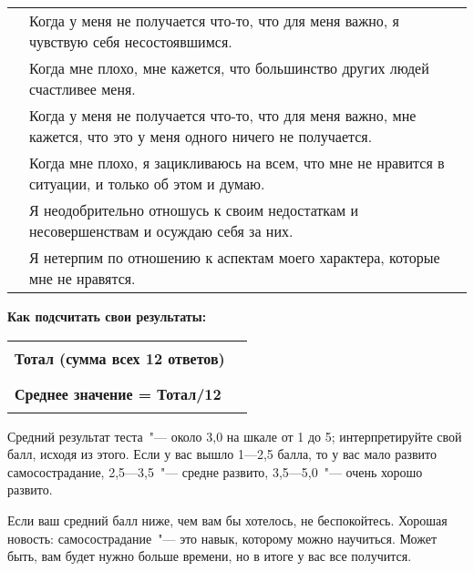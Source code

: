 \begin{center}
	\setlength{\extrarowheight}{2mm}
	\begin{tabularx}{\textwidth}{p{1.7cm}X}
		\noindent\rule{1.7cm}{0.4pt} & Когда у меня не получается что-то, что для меня важно, я чувствую себя несостоявшимся. \\
		\noindent\rule{1.7cm}{0.4pt} & Когда мне плохо, мне кажется, что большинство других людей счастливее меня. \\
		\noindent\rule{1.7cm}{0.4pt} & Когда у меня не получается что-то, что для меня важно, мне кажется, что это у меня одного ничего не получается. \\
		\noindent\rule{1.7cm}{0.4pt} & Когда мне плохо, я зацикливаюсь на всем, что мне не нравится в ситуации, и только об этом и думаю. \\
		\noindent\rule{1.7cm}{0.4pt} & Я неодобрительно отношусь к своим недостаткам и несовершенствам и осуждаю себя за них. \\
		\noindent\rule{1.7cm}{0.4pt} & Я нетерпим по отношению к аспектам моего характера, которые мне не нравятся. \\
	\end{tabularx}
	\setlength{\extrarowheight}{0mm}	
\end{center}

\vspace{3ex}

\noindent\textbf{Как подсчитать свои результаты:}

\begin{flushright}
	\setlength{\extrarowheight}{5mm}
	\begin{tabularx}{11.5cm}{ll}
		\textbf{Тотал (сумма всех 12 ответов)} & \rule{1.7cm}{0.4pt} \\
		\textbf{Среднее значение = Тотал/12} & \rule{1.7cm}{0.4pt}
	\end{tabularx}
	\setlength{\extrarowheight}{0mm}
\end{flushright}

\vspace{3ex}

Средний результат теста~"--- около 3,0 на шкале от 1 до 5; интерпретируйте свой балл, исходя из этого. 
Если у вас вышло 1---2,5 балла, то у вас мало развито самосострадание, 2,5---3,5~"--- средне развито, 3,5---5,0~"--- очень хорошо развито.

\newpage


\vspace{3ex}
Если ваш средний балл ниже, чем вам бы хотелось, не беспокойтесь. Хорошая новость: самосострадание~"--- это навык, которому можно научиться. Может быть, вам будет нужно больше времени, но в итоге у вас все получится. 


